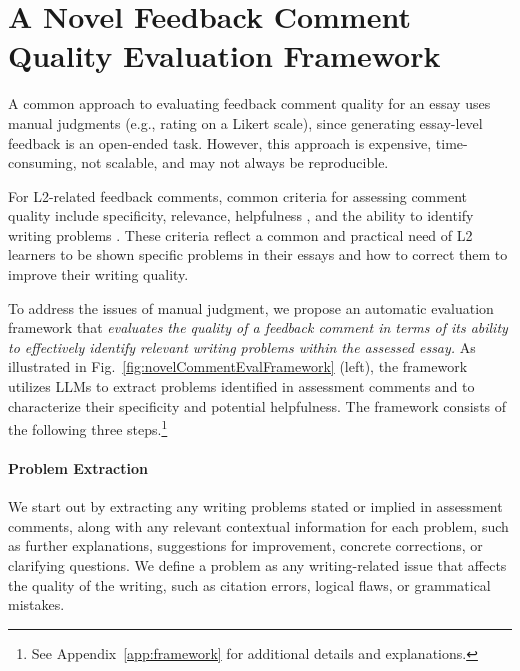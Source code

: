

\section{A Novel Feedback Comment Quality Evaluation Framework\label{sec:evalOfComments}}

A common approach to evaluating feedback comment quality for an
essay uses manual judgments (e.g., rating on a Likert scale), since generating essay-level feedback is an open-ended task. However, this approach is expensive, time-consuming, not scalable, and may not always be reproducible. 

For L2-related feedback comments, common criteria for assessing comment quality include specificity, relevance, helpfulness \citep{han-etal-2024-llm, stahl-etal-2024-exploring, behzad-etal-2024-assessing, behzad-etal-2024-leaf}, and the ability to identify writing problems \citep{stahl-etal-2024-exploring, behzad-etal-2024-assessing, behzad-etal-2024-leaf}. These criteria reflect a common and practical need of L2 learners to be shown specific problems in their essays and how to correct them to improve their writing quality.

To address the issues of manual judgment, we propose an automatic evaluation framework that \textit{evaluates the quality of a feedback comment in terms of its ability to effectively identify relevant writing problems within the assessed essay.} As illustrated in Fig.~\ref{fig:novelCommentEvalFramework} (left), the framework utilizes LLMs to extract problems identified in assessment comments and to characterize their specificity and potential helpfulness. The framework consists of the following three steps.\footnote{See Appendix~\ref{app:framework} for additional details and explanations.} 


\paragraph{Problem Extraction} We start out by extracting any writing problems stated or implied in assessment comments, along with any relevant contextual information for each problem, such as further explanations, suggestions for improvement, concrete corrections, or clarifying questions. We define a problem as any writing-related issue that affects the quality of the writing, such as citation errors, logical flaws, or grammatical mistakes.


